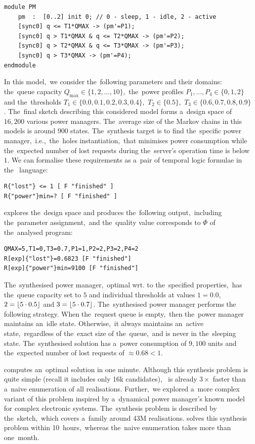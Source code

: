 \begin{verbatim}
module PM
    pm  :  [0..2] init 0; // 0 - sleep, 1 - idle, 2 - active
    [sync0] q <= T1*QMAX -> (pm'=P1);
    [sync0] q > T1*QMAX & q <= T2*QMAX -> (pm'=P2);
    [sync0] q > T2*QMAX & q <= T3*QMAX -> (pm'=P3);
    [sync0] q > T3*QMAX -> (pm'=P4);
endmodule
\end{verbatim}

In this model,~we consider the~following parameters and their domains: the~queue capacity $Q_{\max} \in \{1,2,\dots,10\}$,~the~power profiles $P_1,\dots,P_4 \in \{0,1,2\}$ and the~thresholds $T_1 \in \{0.0,0.1,0.2,0.3,0.4\}$,~$T_2 \in \{0.5\}$,~$T_3 \in \{0.6,0.7,0.8,0.9\}$.
The~final sketch describing this considered model forms a~design space of $16,200$ various power managers.
The~average size of the Markov chains in this models is around $900$ states.
The~synthesis target is to find the~specific power manager,~i.e.,~the~holes instantiation,~that minimises power consumption while the~expected number of lost requests during the~server's operation time is below $1$.
We can formalise these requirements as a~pair of temporal logic formulae in the~\prism{} language:
\begin{verbatim}
R{"lost"} <= 1 [ F "finished" ]  
R{"power"}min=? [ F "finished" ]
\end{verbatim}

\toolname{} explores the~design space and produces the~following output,~including the~parameter assignment,~and the~quality value corresponds to $\Phi$ of the~analysed program:
\begin{verbatim}
QMAX=5,T1=0,T3=0.7,P1=1,P2=2,P3=2,P4=2
R[exp]{"lost"}=0.6823 [F "finished"]
R[exp]{"power"}min=9100 [F "finished"]
\end{verbatim}
The~synthesised power manager,~optimal wrt. to the~specified properties,~has the~queue capacity set to $5$ and individual thresholds at values  $1 = 0.0$, $2 = \lfloor  5\cdot 0.5 \rfloor$ and $3 = \lfloor  5\cdot 0.7 \rfloor$.
The~synthesised power manager performs the following strategy.
When the~request queue is empty,~then the~power manager maintains an~idle state.
Otherwise,~it always maintains an~active state,~regardless of the~exact size of the~queue,~and is never in the~sleeping state.
The~synthesised solution has a~power consumption of $9,100$ units and the~expected number of lost requests of $\approx 0.68 < 1$.

\toolname{} computes an~optimal solution in one minute. 
Although this synthesis problem is quite simple (recall it includes only 16k candidates),~\toolname{} is already $3 \times$ faster than a~naive enumeration of all realisations.
Further,~we explored a~more complex variant of this problem inspired by a~dynamical power manager's known model for complex electronic systems.
The~synthesis problem is described by the~sketch,~which covers a~family around 43M realisations.
\toolname{} solves this synthesis problem within 10~hours,~whereas the~naive enumeration takes more than one~month.
